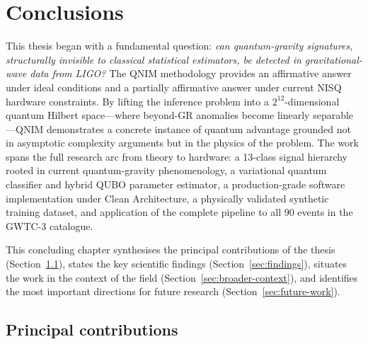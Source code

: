 \documentclass[11pt,a4paper, english]{book}
\theoremstyle{plain}
\theoremstyle{definition}
\numberwithin{equation}{chapter}
\numberwithin{figure}{chapter}
\numberwithin{table}{chapter}
\begin{document}


\chapter{Conclusions}
\label{chap:conclusions}

This thesis began with a fundamental question: \emph{can quantum-gravity 
signatures, structurally invisible to classical statistical estimators, be 
detected in gravitational-wave data from LIGO?} The QNIM methodology provides 
an affirmative answer under ideal conditions and a partially affirmative answer 
under current NISQ hardware constraints. By lifting the inference problem into 
a $2^{12}$-dimensional quantum Hilbert space—where beyond-GR anomalies become 
linearly separable—QNIM demonstrates a concrete instance of quantum advantage 
grounded not in asymptotic complexity arguments but in the physics of the 
problem. The work spans the full research arc from theory to hardware: a 
13-class signal hierarchy rooted in current quantum-gravity phenomenology, a 
variational quantum classifier and hybrid QUBO parameter estimator, a 
production-grade software implementation under Clean Architecture, a 
physically validated synthetic training dataset, and application of the 
complete pipeline to all 90 events in the GWTC-3 catalogue.

This concluding chapter synthesises the principal contributions of the
thesis (Section~\ref{sec:contributions}), states the key scientific
findings (Section~\ref{sec:findings}), situates the work in the context
of the field (Section~\ref{sec:broader-context}), and identifies the most
important directions for future research (Section~\ref{sec:future-work}).



\section{Principal contributions}
\label{sec:contributions}
\end{document}
